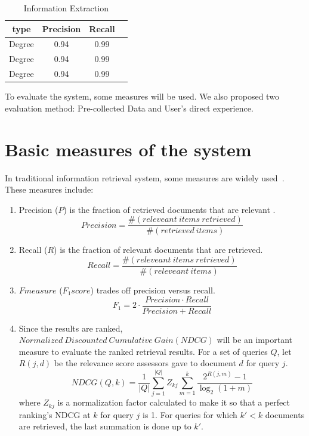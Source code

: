 \begin{table}[ht]
\caption{Information Extraction} %
\centering %
\begin{tabular}{   | c | c | c | c |   }
 \hline
                     type   & Precision & Recall     \\
 \hline
                     Degree & 0.94      & 0.99         \\
 \hline
                     Degree & 0.94      & 0.99      \\
 \hline
                     Degree & 0.94      & 0.99        \\
 \hline
\end{tabular}
\label{tab:ie} %
\end{table}


To evaluate the system, some measures will be used. We also proposed two evaluation method: Pre-collected Data and User's direct experience.

\section{Basic measures of the system}

In traditional information retrieval system, some measures are widely used~\cite{manning2008introduction}. These measures include:

\begin{enumerate}
    \item Precision ($P$) is the fraction of retrieved documents that are relevant .
       $$  Precision =  \frac{ \#(releveant~items~ retrieved)}{ \#(retrieved~items)}$$
    \item Recall ($R$) is the fraction of relevant documents that are retrieved.
       $$  Recall =  \frac{ \#(releveant~items~ retrieved)}{ \#(releveant~items)}$$
    \item $F measure$ ($F_1 score$) trades off precision versus recall.
       $$ F_1 = 2 \cdot \frac{ Precision \cdot Recall}{ Precision + Recall } $$
    \item Since the results are ranked, $ Normalized~Discounted~Cumulative~Gain ( NDCG )$ will be an important measure to evaluate the ranked retrieval results. For a set of queries $Q$, let $R(j,d)$ be the relevance score assessors gave to document $d$ for query $j$.
       $$ NDCG(Q,k) = \frac {1}{|Q|} \sum_{j=1}^{|Q|}{Z_{kj}} \sum_{m=1}^{k} \frac{2^{R(j,m)} - 1}{ \log_2(1+m)} $$
where $Z_{kj}$ is a normalization factor calculated to make it so that a perfect ranking's NDCG at $k$ for query $j$ is 1. For queries for which $k' < k$ documents are retrieved, the last summation is done up to $k'$.

\end{enumerate}

